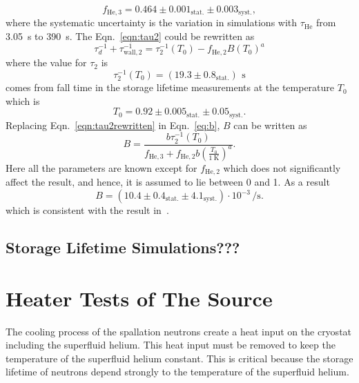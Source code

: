 \begin{equation}
f_\mathrm{He,3} = 0.464 \pm 0.001_\mathrm{stat.} \pm 0.003_\mathrm{syst.},
\end{equation}
where the systematic uncertainty is the variation in simulations with
$\tau_{\mathrm{He}}$ from 3.05~s to 390~s. 
The Eqn.~\ref{eqn:tau2} could be rewritten as
\begin{equation}
  \label{eqn:tau2rewritten}
\tau_d^{-1} + \tau_\mathrm{wall,2}^{-1} = \tau_2^{-1}(T_0) - f_\mathrm{He,2} B \left( T_0 \right)^a
\end{equation}
where the value for $\tau_2$ is
\begin{equation}
\tau_2^{-1}(T_0) = (19.3 \pm 0.8_\mathrm{stat.})\,~\si{\second}
\end{equation}
comes from fall time in the storage lifetime measurements at the
temperature $T_0$ which is
\begin{equation}
T_0 = 0.92 \pm 0.005_\mathrm{stat.} \pm 0.05_\mathrm{syst.}.
\end{equation}
Replacing Eqn.~\ref{eqn:tau2rewritten} in Eqn.~\ref{eq:b}, $B$ can be written as
\begin{equation}
B = \frac{b \tau_2^{-1}(T_0)}{f_\mathrm{He,3} + f_\mathrm{He,2} b \left( \frac{T_0}{\SI{1}{\kelvin}} \right)^a}.
\end{equation}
Here all the parameters are known except for $ f_\mathrm{He,2}$ which
does not significantly affect the result, and hence, it is assumed to
lie between 0 and 1. As a result
\begin{equation}
B = (10.4 \pm 0.4_\mathrm{stat.} \pm 4.1_\mathrm{syst.}) \cdot 10^{-3} \, \si{\per\second}.
\end{equation}
which is consistent with the result in~\cite{Leung2016}.




\subsection{Storage Lifetime Simulations???}



\section{Heater Tests of The Source\label{sec:heattest}}
The cooling process of the spallation neutrons create a heat input on
the cryostat including the superfluid helium. This heat input must be
removed to keep the temperature of the superfluid helium
constant. This is critical because the storage lifetime of neutrons
depend strongly to the temperature of the superfluid helium.

